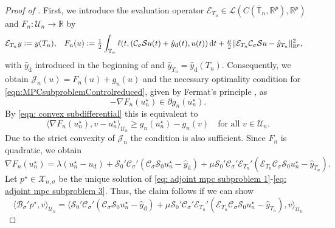 \documentclass[reqno]{amsart}
\newcommand*\closure[1]{\overline{#1}}
\newcommand{\X}{{\mathscr X}}
\newcommand{\U}{{\mathscr U}}
\newcommand{\R}{\mathbb R}
\newcommand{\timeInt}{\mathbb{T}}
\newcommand{\adState}{p}
\newcommand{\desired}[1]{#1_{\mathrm{d}}}
\newcommand{\inpVar}{u}
\newcommand{\inpVarDes}{\desired{u}}
\newcommand{\outVar}{y}
\newcommand{\hatoutVarDes}{\desired{\hat y}}
\newcommand{\outVarDim}{p}
\newcommand{\dt}{\,\mathrm{d}t}
\newcommand{\cOper}{\calC}
\newcommand{\solOper}{\calS_{0}}
\newcommand{\optAdState}{\adState^\star}
\newcommand{\optInpVar}[1]{\inpVar_{#1}^\star}
\newcommand{\optInpVarN}{\optInpVar{n}}
\newcommand{\switch}{\sigma}
\newcommand{\Jhat}{\calJ}
\newcommand{\calB}{\mathcal{B}}
\newcommand{\calC}{\mathcal{C}}
\newcommand{\calE}{\mathcal{E}}
\newcommand{\calJ}{\mathcal{J}}
\newcommand{\calL}{\mathcal{L}}
\newcommand{\calS}{\mathcal{S}}
\begin{document}
\begin{proof}[Proof of ]
    First, we introduce the evaluation operator $\calE_{T_n}\in \calL(C(\closure{\timeInt}_n,\R^p),\R^p)$ and $F_n\colon\U_n\to\R$ by
    \begin{align*}
        \calE_{T_n}\outVar &\vcentcolon= \outVar(T_n), &
        F_n(\inpVar) &\vcentcolon= \tfrac{1}{2}\int_{\timeInt_n} \ell(t,(\cOper_{\switch}\calS\inpVar(t)+\hatoutVarDes(t), \inpVar(t)) \dt + \tfrac{\mu}{2} \|\calE_{T_n}\cOper_{\switch}\calS\inpVar-\hat y_{T_n}\|^2_{\R^{\outVarDim}},
    \end{align*}
    with $\hatoutVarDes$ introduced in the beginning of  and $\hat{y}_{T_n}=\hatoutVarDes(T_n)$. Consequently, we obtain $\Jhat_n(\inpVar) = F_n(\inpVar)+ g_n(\inpVar)$ and the necessary optimality condition for \eqref{eqn:MPCsubproblemControlreduced}, given by Fermat's principle \cite[Thm.~16.3]{bauschke2011convex}, as
    \begin{equation} \nonumber
        -\nabla F_n(\optInpVarN) \in \partial g_n(\optInpVarN).
    \end{equation}
    By \eqref{eqn: convex subdifferential} this is equivalent to
    \begin{equation} \nonumber
        \langle \nabla F_n(\optInpVarN), v-\optInpVarN\rangle_{\U_n} \geq g_n(\optInpVarN)-g_n(v) \quad \text{for all }v \in \U_n.
    \end{equation}
    Due to the strict convexity of $\Jhat_n$ the condition is also sufficient. Since $F_n$ is quadratic, we obtain
    \begin{equation}\label{eqn: derivation of gradient of Fn}\nonumber
        \nabla F_n(\optInpVarN) = \lambda (\optInpVarN-\inpVarDes)+\solOper'\cOper_{\switch}'(\cOper_{\switch}\solOper \optInpVarN-{\hatoutVarDes})+\mu \solOper'\cOper_{\switch}'\calE_{T_n}'(\calE_{T_n}\cOper_{\switch}\solOper \optInpVarN-\hat \outVar_{T_n}).
    \end{equation}
    Let $\optAdState \in \X_{n,\sigma}$ be the unique solution of \eqref{eq: adjoint mpc subproblem 1}-\eqref{eq: adjoint mpc subproblem 3}. Thus, the claim follows if we can show
    \begin{equation*}
         \langle\calB_{\sigma}'\optAdState, v\rangle_{\U_n}= \langle\solOper'\cOper_{\switch}'(\cOper_{\switch}\solOper \optInpVarN-{\hatoutVarDes})+\mu \solOper'\cOper_{\switch}'\calE_{T_n}'(\calE_{T_n}\cOper_{\switch}\solOper \optInpVarN-\hat \outVar_{T_n}),v\rangle_{\U_n}

\end{equation*}
\end{proof}
\end{document}
